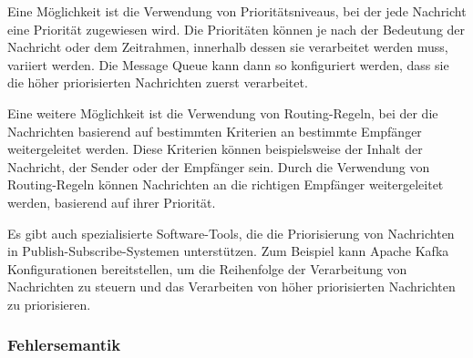 Eine Möglichkeit ist die Verwendung von Prioritätsniveaus, bei der jede Nachricht eine Priorität zugewiesen wird. Die Prioritäten können je nach der Bedeutung der Nachricht oder dem Zeitrahmen, innerhalb dessen sie verarbeitet werden muss, variiert werden. Die Message Queue kann dann so konfiguriert werden, dass sie die höher priorisierten Nachrichten zuerst verarbeitet.

Eine weitere Möglichkeit ist die Verwendung von Routing-Regeln, bei der die Nachrichten basierend auf bestimmten Kriterien an bestimmte Empfänger weitergeleitet werden. Diese Kriterien können beispielsweise der Inhalt der Nachricht, der Sender oder der Empfänger sein. Durch die Verwendung von Routing-Regeln können Nachrichten an die richtigen Empfänger weitergeleitet werden, basierend auf ihrer Priorität.

Es gibt auch spezialisierte Software-Tools, die die Priorisierung von Nachrichten in Publish-Subscribe-Systemen unterstützen. Zum Beispiel kann Apache Kafka Konfigurationen bereitstellen, um die Reihenfolge der Verarbeitung von Nachrichten zu steuern und das Verarbeiten von höher priorisierten Nachrichten zu priorisieren.

\subsubsection{Fehlersemantik}

